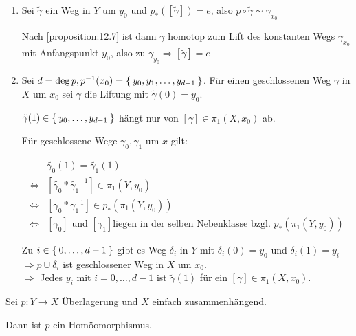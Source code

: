 \begin{beweis}\leavevmode
    \begin{enumerate}[label=\alph*)]
        \item Sei $\tilde{\gamma}$ ein Weg in $Y$ um $y_0$ und
              $p_* ([\tilde{\gamma}]) = e$, also $p \circ \tilde{\gamma} \sim \gamma_{x_0}$

              Nach \cref{proposition:12.7} ist dann 
              $\tilde{\gamma}$ homotop zum Lift des konstanten Wegs
              $\gamma_{x_0}$ mit Anfangspunkt $y_0$, also zu
              $\gamma_{y_0} \Rightarrow [\tilde{\gamma}] = e$
        \item Sei $d = \deg{p}, p^{-1}(x_0) = \Set{y_0, y_1, \dots, y_{d-1}}$.
              Für einen geschlossenen Weg $\gamma$ in $X$ um $x_0$
              sei $\tilde{\gamma}$ die Liftung mit $\tilde{\gamma}(0) = y_0$.

              $\tilde{\gamma}(1) \in \Set{y_0, \dots, y_{d-1}}$ hängt
              nur von $[\gamma] \in \pi_1(X,x_0)$ ab.

              Für geschlossene Wege $\gamma_0, \gamma_1$ um $x$ gilt:

              \begin{align*}
                &\tilde{\gamma_0}(1) = \tilde{\gamma_1}(1)\\
                \Leftrightarrow &[\tilde{\gamma_0} * \tilde{\gamma_1}^{-1}] \in \pi_1(Y, y_0)\\
                \Leftrightarrow &[\gamma_0 * \gamma_1^{-1}] \in p_* (\pi_1(Y,y_0))\\
                \Leftrightarrow &[\gamma_0] \text{ und } [\gamma_1] \text{liegen in der selben Nebenklasse bzgl. } p_*(\pi_1(Y, y_0))
              \end{align*}

              Zu $i \in \Set{0, \dots, d-1}$ gibt es Weg $\delta_i$ in
              $Y$ mit $\delta_i(0) = y_0$ und $\delta_i(1) = y_i$\\
              $\Rightarrow p \cup \delta_i$ ist geschlossener Weg in 
              $X$ um $x_0$.\\
              $\Rightarrow$ Jedes $y_i$ mit $i=0, \dots, d-1$ ist 
              $\tilde{\gamma}(1)$ für ein $[\gamma] \in \pi_1(X,x_0)$.
    \end{enumerate}
\end{beweis}

\begin{bemerkung}%
    Sei $p: Y \rightarrow X$ Überlagerung und $X$ einfach zusammenhängend.

    Dann ist $p$ ein Homöomorphismus.
\end{bemerkung}

